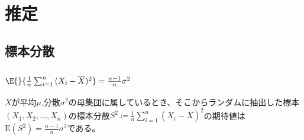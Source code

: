 \chapter{推定}
    \section{標本分散}
        \subsection{\texorpdfstring{$\E{}{\frac{1}{n}\sum_{i=1}^{n}{(X_i-\overline{X})^2}} = \frac{n-1}{n}\sigma^2$}{E((1/n)Σ\_\{i=1\}\string^n (Xi - sampleAvg(X))\string^2) = ((n-1)/n)σ\string^2}}
            \begin{shadebox}
                $X$が平均$\mu$,分散$\sigma^2$の母集団に属しているとき、そこからランダムに抽出した標本$(X_1,X_2,\dots,X_n)$の標本分散$\displaystyle S^2 \coloneqq \frac{1}{n}\sum_{i=1}^{n}{(X_i-\overline{X})^2}$の期待値は$\displaystyle \text{E}(S^2) = \frac{n-1}{n}\sigma^2$である。
            \end{shadebox}
